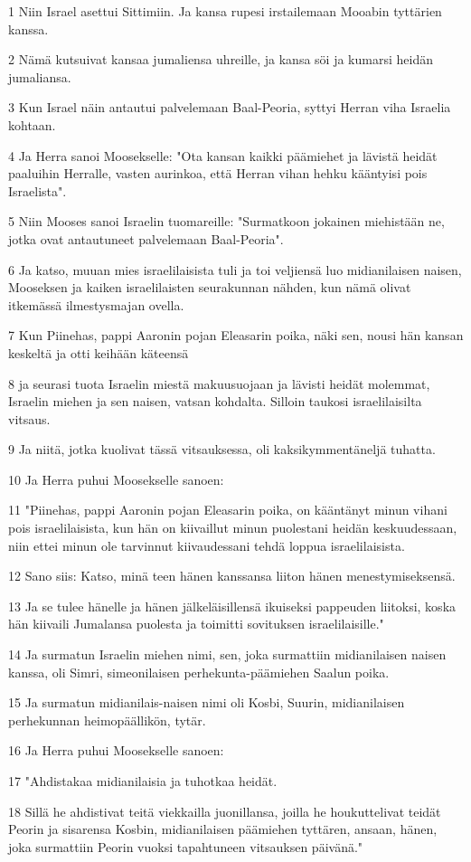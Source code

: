 \par 1 Niin Israel asettui Sittimiin. Ja kansa rupesi irstailemaan Mooabin tyttärien kanssa.
\par 2 Nämä kutsuivat kansaa jumaliensa uhreille, ja kansa söi ja kumarsi heidän jumaliansa.
\par 3 Kun Israel näin antautui palvelemaan Baal-Peoria, syttyi Herran viha Israelia kohtaan.
\par 4 Ja Herra sanoi Moosekselle: "Ota kansan kaikki päämiehet ja lävistä heidät paaluihin Herralle, vasten aurinkoa, että Herran vihan hehku kääntyisi pois Israelista".
\par 5 Niin Mooses sanoi Israelin tuomareille: "Surmatkoon jokainen miehistään ne, jotka ovat antautuneet palvelemaan Baal-Peoria".
\par 6 Ja katso, muuan mies israelilaisista tuli ja toi veljiensä luo midianilaisen naisen, Mooseksen ja kaiken israelilaisten seurakunnan nähden, kun nämä olivat itkemässä ilmestysmajan ovella.
\par 7 Kun Piinehas, pappi Aaronin pojan Eleasarin poika, näki sen, nousi hän kansan keskeltä ja otti keihään käteensä
\par 8 ja seurasi tuota Israelin miestä makuusuojaan ja lävisti heidät molemmat, Israelin miehen ja sen naisen, vatsan kohdalta. Silloin taukosi israelilaisilta vitsaus.
\par 9 Ja niitä, jotka kuolivat tässä vitsauksessa, oli kaksikymmentäneljä tuhatta.
\par 10 Ja Herra puhui Moosekselle sanoen:
\par 11 "Piinehas, pappi Aaronin pojan Eleasarin poika, on kääntänyt minun vihani pois israelilaisista, kun hän on kiivaillut minun puolestani heidän keskuudessaan, niin ettei minun ole tarvinnut kiivaudessani tehdä loppua israelilaisista.
\par 12 Sano siis: Katso, minä teen hänen kanssansa liiton hänen menestymiseksensä.
\par 13 Ja se tulee hänelle ja hänen jälkeläisillensä ikuiseksi pappeuden liitoksi, koska hän kiivaili Jumalansa puolesta ja toimitti sovituksen israelilaisille."
\par 14 Ja surmatun Israelin miehen nimi, sen, joka surmattiin midianilaisen naisen kanssa, oli Simri, simeonilaisen perhekunta-päämiehen Saalun poika.
\par 15 Ja surmatun midianilais-naisen nimi oli Kosbi, Suurin, midianilaisen perhekunnan heimopäällikön, tytär.
\par 16 Ja Herra puhui Moosekselle sanoen:
\par 17 "Ahdistakaa midianilaisia ja tuhotkaa heidät.
\par 18 Sillä he ahdistivat teitä viekkailla juonillansa, joilla he houkuttelivat teidät Peorin ja sisarensa Kosbin, midianilaisen päämiehen tyttären, ansaan, hänen, joka surmattiin Peorin vuoksi tapahtuneen vitsauksen päivänä."

